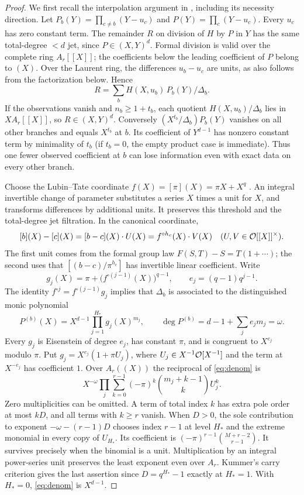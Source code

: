 \begin{proof}
We first recall the interpolation argument in \cite{oldbranches}, including its necessity direction. Let $P_b(Y)=\prod_{c\ne b}(Y-u_c)$ and $P(Y)=\prod_c(Y-u_c)$. Every $u_c$ has zero constant term. The remainder $R$ on division of $H$ by $P$ in $Y$ has the same total-degree $<d$ jet, since $P\in(X,Y)^d$. Formal division is valid over the complete ring $A_r[[X]]$; the coefficients below the leading coefficient of $P$ belong to $(X)$. Over the Laurent ring, the differences $u_b-u_c$ are units, as also follows from the factorization below. Hence
\[
 R=\sum_b H(X,u_b)\,P_b(Y)/\Delta_b .
\]
If the observations vanish and $n_b\ge1+t_b$, each quotient $H(X,u_b)/\Delta_b$ lies in $XA_r[[X]]$, so $R\in(X,Y)^d$. Conversely $(X^{t_b}/\Delta_b)P_b(Y)$ vanishes on all other branches and equals $X^{t_b}$ at $b$. Its coefficient of $Y^{d-1}$ has nonzero constant term by minimality of $t_b$ (if $t_b=0$, the empty product case is immediate). Thus one fewer observed coefficient at $b$ can lose information even with exact data on every other branch.

Choose the Lubin--Tate coordinate $f(X)=[\pi](X)=\pi X+X^q$ \cite{lt}. An integral invertible change of parameter substitutes a series $X$ times a unit for $X$, and transforms differences by additional units. It preserves this threshold and the total-degree jet filtration. In the canonical coordinate,
\[
 [b](X)-[c](X)=[b-c](X)\cdot U(X)
              = f^{\circ h_c}(X)\cdot V(X)
 \quad (U,V\in\mathcal O[[X]]^\times).
\]
The first unit comes from the formal group law $F(S,T)-S=T(1+\cdots)$; the second uses that $[(b-c)/\pi^{h_c}]$ has invertible linear coefficient. Write
\[
 g_j(X)=\pi+\big(f^{\circ(j-1)}(X)\big)^{q-1},\qquad
 e_j=(q-1)q^{j-1}.
\]
The identity $f^{\circ j}=f^{\circ(j-1)}g_j$ implies that $\Delta_b$ is associated to the distinguished monic polynomial
\begin{equation}
        P^{(b)}(X)=X^{d-1}\prod_{j=1}^{H_*}g_j(X)^{m_j},
        \qquad \deg P^{(b)}=d-1+\sum_j e_jm_j=\omega .
        \label{eq:denom}
\end{equation}
Every $g_j$ is Eisenstein of degree $e_j$, has constant $\pi$, and is congruent to $X^{e_j}$ modulo $\pi$. Put $g_j=X^{e_j}(1+\pi U_j)$, where $U_j\in X^{-1}\mathcal O[X^{-1}]$ and the term at $X^{-e_j}$ has coefficient $1$. Over $A_r((X))$ the reciprocal of \eqref{eq:denom} is
\begin{equation}
 X^{-\omega}\prod_j\sum_{k=0}^{r-1}
       (-\pi)^k {m_j+k-1\choose k} U_j^k .
 \label{eq:inverse}
\end{equation}
Zero multiplicities can be omitted. A term of total index $k$ has extra pole order at most $kD$, and all terms with $k\ge r$ vanish. When $D>0$, the sole contribution to exponent $-\omega-(r-1)D$ chooses index $r-1$ at level $H_*$ and the extreme monomial in every copy of $U_{H_*}$. Its coefficient is $(-\pi)^{r-1}{M+r-2\choose r-1}$. It survives precisely when the binomial is a unit. Multiplication by an integral power-series unit preserves the least exponent even over $A_r$. Kummer's carry criterion gives the last assertion since $D=q^{H_*}-1$ exactly at $H_*=1$. With $H_*=0$, \eqref{eq:denom} is $X^{d-1}$.
\end{proof}


